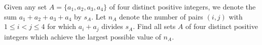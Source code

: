 Given any set 
$A = \{a_1, a_2, a_3, a_4\}$
 of four distinct positive integers, we denote the sum 
$a_1 +a_2 +a_3 +a_4$
 by 
$s_A$.
 Let 
$n_A$
 denote the number of pairs 
$(i, j)$
 with 
$1 \leq  i < j \leq 4$
 for which 
$a_i +a_j$
 divides 
$s_A$.
 Find all sets 
$A$
 of four distinct positive integers which achieve the largest possible value of 
$n_A$.
